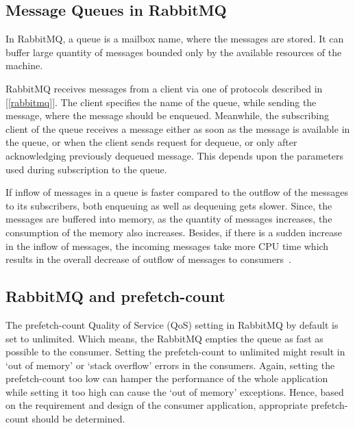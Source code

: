   \subsection{Message Queues in RabbitMQ}
  In RabbitMQ, a queue is a mailbox name, where the messages are stored. It can buffer large quantity of messages bounded only by the available resources of the machine.

  RabbitMQ receives messages from a client via one of protocols described in [\autoref{rabbitmq}]. The client specifies the name of the queue, while sending the message, where the message should be enqueued. Meanwhile, the subscribing client of the queue receives a message either as soon as the message is available in the queue, or when the client sends request for dequeue, or only after acknowledging previously dequeued message. This depends upon the parameters used during subscription to the queue.

  If inflow of messages in a queue is faster compared to the outflow of the messages to its subscribers, both enqueuing as well as dequeuing gets slower. Since, the messages are buffered into memory, as the quantity of messages increases, the consumption of the memory also increases. Besides, if there is a sudden increase in the inflow of messages, the incoming messages take more CPU time which results in the overall decrease of outflow of messages to consumers~\cite{sizingYourRabbits}.

  \subsection{RabbitMQ and prefetch-count}
  \label{sec:rabbitmq}
  The prefetch-count Quality of Service (QoS) setting in RabbitMQ by default is set to unlimited. Which means, the RabbitMQ empties the queue as fast as possible to the consumer. Setting the prefetch-count to unlimited might result in ‘out of memory’ or ‘stack overflow’ errors in the consumers. Again, setting the prefetch-count too low can hamper the performance of the whole application while setting it too high can cause the ‘out of memory’ exceptions. Hence, based on the requirement and design of the consumer application, appropriate prefetch-count should be determined.

